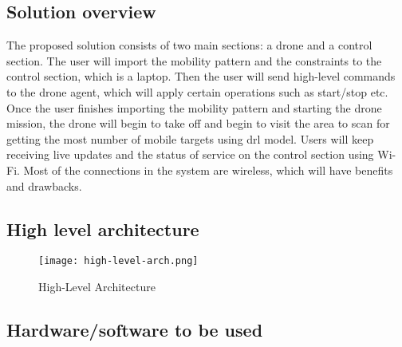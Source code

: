 \documentclass[../main.tex]{subfiles}
\begin{document}
\subsection{Solution overview}

The proposed solution consists of two main sections: a drone and a control section. The user will import
the mobility pattern and the constraints to the control section, which is a laptop. Then the user will send high-level commands to the drone agent, which will apply certain operations such as start/stop etc. Once the user finishes importing the mobility pattern and starting the drone mission, the drone will begin to take off and begin to visit the area to scan for getting the most number of mobile targets using \gls{drl} model. Users will keep receiving live updates and the status of service on the control section using Wi-Fi. Most of the connections in the system are wireless, which will have benefits and drawbacks.


\subsection{High level architecture}

\begin{figure}[H]
	\centering
	\texttt{[image: high-level-arch.png]}
	\caption{High-Level Architecture}\label{fig:arch-fig}
\end{figure}


\subsection{Hardware/software to be used}
\end{document}
